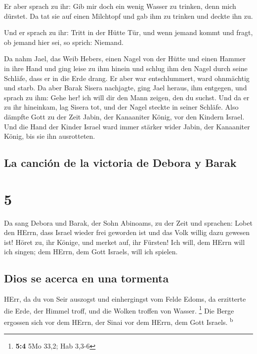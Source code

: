  Er aber sprach zu ihr: Gib mir doch ein wenig Wasser zu
trinken, denn mich dürstet. Da tat sie auf einen Milchtopf und gab ihm
zu trinken und deckte ihn zu.

 Und er sprach zu ihr: Tritt in der Hütte Tür, und wenn
jemand kommt und fragt, ob jemand hier sei, so sprich: Niemand.

 Da nahm Jael, das Weib Hebers, einen Nagel von der Hütte
und einen Hammer in ihre Hand und ging leise zu ihm hinein und schlug
ihm den Nagel durch seine Schläfe, dass er in die Erde drang. Er aber
war entschlummert, ward ohnmächtig und starb.  Da aber
Barak Sisera nachjagte, ging Jael heraus, ihm entgegen, und sprach zu
ihm: Gehe her! ich will dir den Mann zeigen, den du suchst. Und da er zu
ihr hineinkam, lag Sisera tot, und der Nagel steckte in seiner Schläfe.
 Also dämpfte Gott zu der Zeit Jabin, der Kanaaniter
König, vor den Kindern Israel.  Und die Hand der Kinder
Israel ward immer stärker wider Jabin, der Kanaaniter König, bis sie ihn
ausrotteten.

\hypertarget{la-canciuxf3n-de-la-victoria-de-debora-y-barak}{%
\subsection{La canción de la victoria de Debora y
Barak}\label{la-canciuxf3n-de-la-victoria-de-debora-y-barak}}

\hypertarget{section-4}{%
\section{5}\label{section-4}}

 Da sang Debora und Barak, der Sohn Abinoams, zu der Zeit
und sprachen:  Lobet den HErrn, dass Israel wieder frei
geworden ist und das Volk willig dazu gewesen ist!  Höret
zu, ihr Könige, und merket auf, ihr Fürsten! Ich will, dem HErrn will
ich singen; dem HErrn, dem Gott Israels, will ich spielen.

\hypertarget{dios-se-acerca-en-una-tormenta}{%
\subsection{Dios se acerca en una
tormenta}\label{dios-se-acerca-en-una-tormenta}}

 HErr, da du von Seir auszogst und einhergingst vom Felde
Edoms, da erzitterte die Erde, der Himmel troff, und die Wolken troffen
von Wasser. \footnote{\textbf{5:4} 5Mo 33,2; Hab 3,3-6} 
Die Berge ergossen sich vor dem HErrn, der Sinai vor dem HErrn, dem Gott
Israels. \textsuperscript{b}


